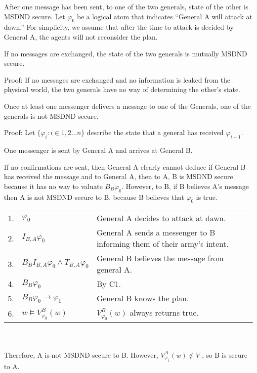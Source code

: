 After one message has been sent, to one of the two generals, state of the other is MSDND secure. Let $\varphi_0$ be a logical atom that indicates ``General A will attack at dawn.'' For simplicity, we assume that after the time to attack is decided by General A, the agents will not reconsider the plan.

\begin{thm}
If no messages are exchanged, the state of the two generals is mutually MSDND secure. \label{thm:nomsg}
\end{thm}

Proof: If no messages are exchanged and no information is leaked from the physical world, the two generals have no way of determining the other's state.

\begin{thm}
Once at least one messenger delivers a message to one of the Generals, one of the generals is not MSDND secure.
\end{thm}

Proof:
Let $\{ \varphi_i : i \in 1,2 ... n \}$ describe the state that a general has received $\varphi_{i-1}$.

\begin{case}
One messenger is sent by General A and arrives at General B.
\label{case:generalsn0}
\end{case}

If no confirmations are sent, then General A clearly cannot deduce if General B has received the message and to General A, then to A, B is MSDND secure because it has no way to valuate $B_B \varphi_0$. However, to B, if B believes A's message then A is not MSDND secure to B, because B believes that $\varphi_0$ is true.

\begin{table}[h!]
\centering
\small
\begin{tabularx}{\linewidth}{l l X}
1. & $\varphi_0$ & General A decides to attack at dawn. \\
2. & $I_{B,A} \varphi_0$ & General A sends a messenger to B informing them of their army's intent. \\
3. & $B_{B}I_{B,A} \varphi_0 \wedge T_{B,A} \varphi_0$ & General B believes the message from general A. \\
4. & $B_{B} \varphi_0$ & By C1. \\
5. & $B_{B} \varphi_0 \rightarrow \varphi_1$ & General B knows the plan. \\
6. & $w \vDash V_{\varphi_0}^{B}(w)$ & $V_{\varphi_0}^{B}(w)$ always returns true. \\
\end{tabularx} \\~\\
Therefore, A is not MSDND secure to B. However, $V_{\varphi_1}^{A}(w) \not \in V$ , so B is secure to A.
\label{tab:twoarmiesproof}
\end{table}

